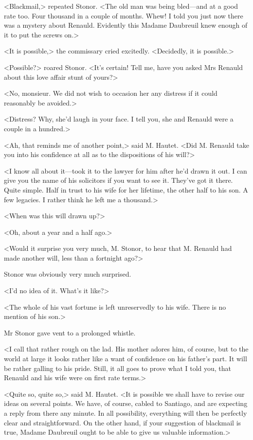  <Blackmail,> repeated Stonor. <The old man was being bled—and at a good rate too. Four thousand in a couple of months. Whew! I told you just now there was a mystery about Renauld. Evidently this Madame Daubreuil knew enough of it to put the screws on.> 

 <It is possible,> the commissary cried excitedly. <Decidedly, it is possible.> 

 <Possible?> roared Stonor. <It's certain! Tell me, have you asked Mrs Renauld about this love affair stunt of yours?> 

 <No, monsieur. We did not wish to occasion her any distress if it could reasonably be avoided.> 

 <Distress? Why, she'd laugh in your face. I tell you, she and Renauld were a couple in a hundred.> 

 <Ah, that reminds me of another point,> said M. Hautet. <Did M. Renauld take you into his confidence at all as to the dispositions of his will?> 

 <I know all about it—took it to the lawyer for him after he'd drawn it out. I can give you the name of his solicitors if you want to see it. They've got it there. Quite simple. Half in trust to his wife for her lifetime, the other half to his son. A few legacies. I rather think he left me a thousand.> 

 <When was this will drawn up?> 

 <Oh, about a year and a half ago.> 

 <Would it surprise you very much, M. Stonor, to hear that M. Renauld had made another will, less than a fortnight ago?> 

 Stonor was obviously very much surprised. 

 <I'd no idea of it. What's it like?> 

 <The whole of his vast fortune is left unreservedly to his wife. There is no mention of his son.> 

 Mr Stonor gave vent to a prolonged whistle. 

 <I call that rather rough on the lad. His mother adores him, of course, but to the world at large it looks rather like a want of confidence on his father's part. It will be rather galling to his pride. Still, it all goes to prove what I told you, that Renauld and his wife were on first rate terms.> 

 <Quite so, quite so,> said M. Hautet. <It is possible we shall have to revise our ideas on several points. We have, of course, cabled to Santiago, and are expecting a reply from there any minute. In all possibility, everything will then be perfectly clear and straightforward. On the other hand, if your suggestion of blackmail is true, Madame Daubreuil ought to be able to give us valuable information.> 

